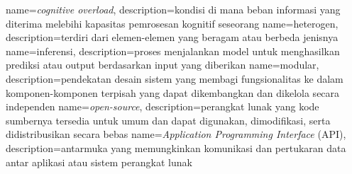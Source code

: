 {
	name={\textit{cognitive overload}},
	description={kondisi di mana beban informasi yang diterima melebihi kapasitas pemrosesan kognitif seseorang}
}
{
	name={heterogen},
	description={terdiri dari elemen-elemen yang beragam atau berbeda jenisnya}
}
{
	name={inferensi},
	description={proses menjalankan model untuk menghasilkan prediksi atau output berdasarkan input yang diberikan}
}
{
	name={modular},
	description={pendekatan desain sistem yang membagi fungsionalitas ke dalam komponen-komponen terpisah yang dapat dikembangkan dan dikelola secara independen}
}
{
	name={\textit{open-source}},
	description={perangkat lunak yang kode sumbernya tersedia untuk umum dan dapat digunakan, dimodifikasi, serta didistribusikan secara bebas}
}
{
	name={\textit{Application Programming Interface} (API)},
	description={antarmuka yang memungkinkan komunikasi dan pertukaran data antar aplikasi atau sistem perangkat lunak}
}